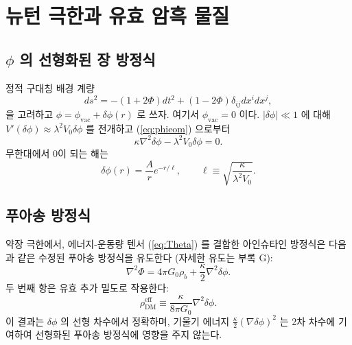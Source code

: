 \documentclass[12pt,a4paper]{article}
\begin{document}
	\section{뉴턴 극한과 유효 암흑 물질}
	
	\subsection{\(\phi\) 의 선형화된 장 방정식}
	정적 구대칭 배경 계량
	\[
	ds^2 = -(1+2\Phi)dt^2 + (1-2\Phi)\delta_{ij}dx^i dx^j,
	\]
	을 고려하고 \(\phi = \phi_{\mathrm{vac}} + \delta\phi(r)\) 로 쓰자. 여기서 \(\phi_{\mathrm{vac}} = 0\) 이다. \(|\delta\phi| \ll 1\) 에 대해 \(V'(\delta\phi) \approx \lambda^2 V_0 \delta\phi\) 를 전개하고 (\ref{eq:phieom}) 으로부터
	\begin{equation}
		\kappa \nabla^2 \delta\phi - \lambda^2 V_0 \delta\phi = 0.
		\label{eq:lin-phi}
	\end{equation}
	무한대에서 0이 되는 해는
	\begin{equation}
		\delta\phi(r) = \frac{A}{r} e^{-r/\ell}, \qquad \ell \equiv \sqrt{\frac{\kappa}{\lambda^2 V_0}}.
		\label{eq:deltaphi-sol}
	\end{equation}
	
	\subsection{푸아송 방정식}
	약장 극한에서, 에너지-운동량 텐서 (\ref{eq:Theta}) 를 결합한 아인슈타인 방정식은 다음과 같은 수정된 푸아송 방정식을 유도한다 (자세한 유도는 부록 G):
	\begin{equation}
		\nabla^2 \Phi = 4\pi G_0 \rho_b + \frac{\kappa}{2} \nabla^2 \delta\phi.
		\label{eq:poisson}
	\end{equation}
	두 번째 항은 유효 추가 밀도로 작용한다:
	\begin{equation}
		\rho_{\mathrm{DM}}^{\mathrm{eff}} \equiv \frac{\kappa}{8\pi G_0} \nabla^2 \delta\phi.
		\label{eq:rhoDM}
	\end{equation}
	이 결과는 \(\delta\phi\) 의 선형 차수에서 정확하며, 기울기 에너지 \(\frac{\kappa}{2}(\nabla\delta\phi)^2\) 는 2차 차수에 기여하여 선형화된 푸아송 방정식에 영향을 주지 않는다.
	
\end{document}
